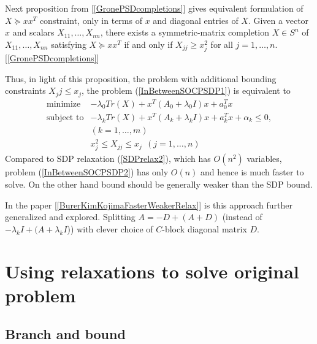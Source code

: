 \documentclass[10pt,oneside]{book}
\theoremstyle{definition}
\begin{document}
Next proposition from [\ref{GronePSDcompletions}] gives equivalent formulation of $X\succeq xx^T$ constraint, only in terms of $x$ and diagonal entries of $X$.
\prop[Grone et. al] Given a vector $x$ and scalars $X_{11},\dots ,X_{nn}$, there exists
a symmetric-matrix completion $X\in S^n$ of $X_{11},\dots ,X_{nn}$ satisfying $X \succeq xx^T$ if and only if $X_{jj} \geq x^2_j$ for all $j = 1,\dots ,n.$ \rm [\ref{GronePSDcompletions}]

Thus, in light of this proposition, the problem with additional bounding constraints $X_jj\leq x_j$, the problem (\ref{InBetweenSOCPSDP1}) is equivalent to 
\begin{equation}
\label{InBetweenSOCPSDP2}
\begin{array}{ll}
\mbox{minimize}& -\lambda_0 Tr(X) +  x^T(A_0+\lambda_0 I)x + a_0^Tx \\
\mbox{subject to}& -\lambda_k Tr(X) +  x^T(A_k+\lambda_kI)x + a_k^Tx + \alpha_k \leq 0, \\ &(k = 1,\dots ,m) \\
& x_j^2\leq X_{jj} \leq x_j \ \ (j = 1,\dots ,n)
\end{array} 
\end{equation}
Compared to SDP relaxation (\ref{SDPrelax2}), which has $O(n^2)$ variables, problem (\ref{InBetweenSOCPSDP2}) has only $O(n)$ and hence is much faster to solve. On the other hand bound should be generally weaker than the SDP bound.

In the paper [\ref{BurerKimKojimaFasterWeakerRelax}] is this approach further generalized and explored. Splitting $A= -D + (A+D)$ (instead of $-\lambda_kI + (A +\lambda_kI$)) with clever choice of $C$-block diagonal matrix $D$. 


\section{Using relaxations to solve original problem }

\subsection{Branch and bound}
\end{document}
